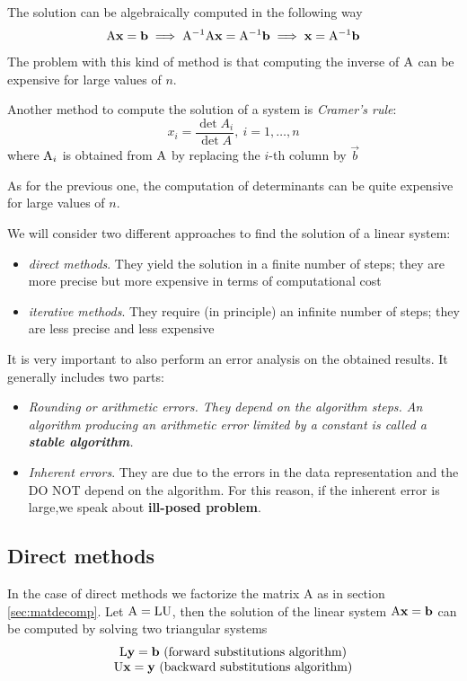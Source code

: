 The solution can be algebraically computed in the following way
$$ \mathrm{A}\mathbf{x} = \mathbf{b} \implies \mathrm{A}^{-1}\mathrm{A}\mathbf{x} = \mathrm{A}^{-1}\mathbf{b} \implies \mathbf{x} = \mathrm{A}^{-1}\mathbf{b} $$
The problem with this kind of method is that computing the inverse of $\mathrm{A}$ can be expensive for large values of $n$.

Another method to compute the solution of a system is \textit{Cramer's rule}:
$$ x_i = \frac{\det{A_i}}{\det{A}},\ i = 1, \hdots, n $$
where $\mathrm{A}_i$ is obtained from $\mathrm{A}$ by replacing the $i$-th column by $\vec{b}$

As for the previous one, the computation of determinants can be quite expensive for large values of $n$.

We will consider two different approaches to find the solution of a linear system:

\begin{itemize}
    \item \textit{direct methods}. They yield the solution in a finite number of steps; they are more precise but more expensive in terms of computational cost
    \item \textit{iterative methods}. They require (in principle) an infinite number of steps; they are less precise and less expensive
\end{itemize}

It is very important to also perform an error analysis on the obtained results. It generally includes two parts:
\begin{itemize}
    \item \em{Rounding} or \em{arithmetic errors}. They depend on the algorithm steps. An algorithm producing an arithmetic error limited by a constant is called a \textbf{stable algorithm}.
    \item \textit{Inherent errors}. They are due to the errors in the data representation and the DO NOT depend on the algorithm. For this reason, if the inherent error is large,we speak about \textbf{ill-posed problem}.
\end{itemize}

\subsection{Direct methods}

In the case of direct methods we factorize the matrix A as in section \ref{sec:matdecomp}.
Let $\mathrm{A}=\mathrm{L} \mathrm{U}$, then 
 the solution of the linear system $\mathrm{A}\mathbf{x} = \mathbf{b}$ can be computed by solving two triangular systems
$$
    \begin{matrix}
        \mathrm{L}\mathbf{y} = \mathbf{b}\ \text{(forward substitutions algorithm)}\\
        \mathrm{U}\mathbf{x} = \mathbf{y}\ \text{(backward substitutions algorithm)}
    \end{matrix}
$$

